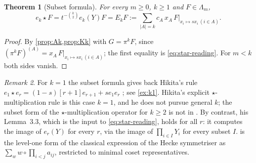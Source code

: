 \documentclass[11pt]{amsart}
\newtheorem{theorem}{Theorem}[section]
\theoremstyle{definition}
\theoremstyle{remark}
\newtheorem{remark}[theorem]{Remark}
\numberwithin{equation}{section}
\newcommand{\Lam}{\Lambda}
\begin{document}
\begin{theorem}[Subset formula]\label{thm:subset}
For every $m\ge0$, $k\ge1$ and $F\in\Lam_m$,
\[ e_k\star F=t^{-\binom k2}e_k(Y)F=E_kF:=\sum_{|A|=k}c_A\,x_A\,F\big|_{x_i\mapsto sx_i\ (i\in A)} . \]
\end{theorem}
\begin{proof}
By \cref{prop:Ak,prop:Kk} with $G=\pi^kF$, since $(\pi^kF)^{(A)}=x_A\,F|_{x_i\mapsto sx_i\,(i\in A)}$; the first equality is \eqref{eq:star-reading}. For $m<k$ both sides vanish.
\end{proof}

\begin{remark}\label{rem:subset-DFK}
For $k=1$ the subset formula gives back Hikita's rule $e_1\star e_r=(1-s)[r+1]e_{r+1}+se_1e_r$ \cite[Thm.~3.12]{Hikita25}; see \cref{ex:k1}. Hikita's explicit $\star$-multiplication rule is this case $k=1$, and he does not pursue general $k$; the subset form of the $\star$-multiplication operator for $k\ge2$ is not in \cite{Hikita25}. By contrast, his Lemma~3.3, which is the input to \eqref{eq:star-reading}, holds for all $r$: it computes the image of $e_r(Y)$ for every $r$, via the image of $\prod_{i\in I}Y_i$ for every subset $I$.  is the level-one form of the classical expression of the Hecke symmetriser as $\sum_ww\circ\prod_{i<j}a_{ij}$, restricted to minimal coset representatives.


\end{remark}
\end{document}
